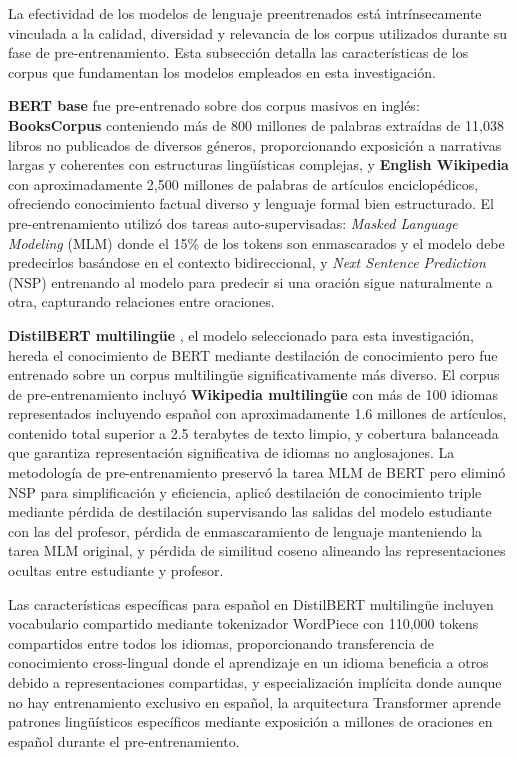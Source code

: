 La efectividad de los modelos de lenguaje preentrenados está intrínsecamente vinculada a la calidad, diversidad y relevancia de los corpus utilizados durante su fase de pre-entrenamiento. Esta subsección detalla las características de los corpus que fundamentan los modelos empleados en esta investigación.

\textbf{BERT base} \cite{devlin2018bert} fue pre-entrenado sobre dos corpus masivos en inglés: \textbf{BooksCorpus} conteniendo más de 800 millones de palabras extraídas de 11,038 libros no publicados de diversos géneros, proporcionando exposición a narrativas largas y coherentes con estructuras lingüísticas complejas, y \textbf{English Wikipedia} con aproximadamente 2,500 millones de palabras de artículos enciclopédicos, ofreciendo conocimiento factual diverso y lenguaje formal bien estructurado. El pre-entrenamiento utilizó dos tareas auto-supervisadas: \textit{Masked Language Modeling} (MLM) donde el 15\% de los tokens son enmascarados y el modelo debe predecirlos basándose en el contexto bidireccional, y \textit{Next Sentence Prediction} (NSP) entrenando al modelo para predecir si una oración sigue naturalmente a otra, capturando relaciones entre oraciones.

\textbf{DistilBERT multilingüe} \cite{sanh2019distilbert}, el modelo seleccionado para esta investigación, hereda el conocimiento de BERT mediante destilación de conocimiento pero fue entrenado sobre un corpus multilingüe significativamente más diverso. El corpus de pre-entrenamiento incluyó \textbf{Wikipedia multilingüe} con más de 100 idiomas representados incluyendo español con aproximadamente 1.6 millones de artículos, contenido total superior a 2.5 terabytes de texto limpio, y cobertura balanceada que garantiza representación significativa de idiomas no anglosajones. La metodología de pre-entrenamiento preservó la tarea MLM de BERT pero eliminó NSP para simplificación y eficiencia, aplicó destilación de conocimiento triple mediante pérdida de destilación supervisando las salidas del modelo estudiante con las del profesor, pérdida de enmascaramiento de lenguaje manteniendo la tarea MLM original, y pérdida de similitud coseno alineando las representaciones ocultas entre estudiante y profesor.

Las características específicas para español en DistilBERT multilingüe incluyen vocabulario compartido mediante tokenizador WordPiece con 110,000 tokens compartidos entre todos los idiomas, proporcionando transferencia de conocimiento cross-lingual donde el aprendizaje en un idioma beneficia a otros debido a representaciones compartidas, y especialización implícita donde aunque no hay entrenamiento exclusivo en español, la arquitectura Transformer aprende patrones lingüísticos específicos mediante exposición a millones de oraciones en español durante el pre-entrenamiento.

